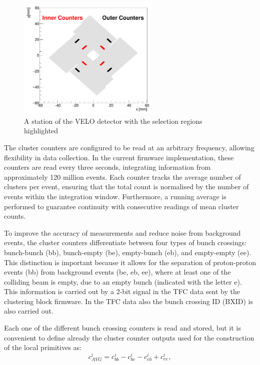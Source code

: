 \begin{figure}
    \centering
    \includegraphics[width=0.6\textwidth]{figures/counters.png}
    \caption{A station of the VELO detector with the selection regions highlighted}
    \label{fig:VELO-counters}
\end{figure}

The cluster counters are configured to be read at an arbitrary frequency, allowing flexibility in data collection. In the current firmware implementation, these counters are read every three seconds, integrating information from approximately 120 million events. 
Each counter tracks the average number of clusters per event, ensuring that the total count is normalised by the number of events within the integration window. Furthermore, a running average is performed to guarantee continuity with consecutive readings of mean cluster counts.

To improve the accuracy of measurements and reduce noise from background events, the cluster counters differentiate between four types of bunch crossings: bunch-bunch (bb), bunch-empty (be), empty-bunch (eb), and empty-empty (ee). This distinction is important because it allows for the separation of proton-proton events (bb) from background events (be, eb, ee), where at least one of the colliding beam is empty, due to an empty bunch (indicated with the letter e). This information is carried out by a 2-bit signal in the TFC data sent by the clustering block firmware. In the TFC data also the bunch crossing ID (BXID) is also carried out.

Each one of the different bunch crossing counters is read and stored, but it is convenient to define already the cluster counter outputs used for the construction of the local primitives as: 
\begin{equation}
    c^i_{AVG} = c^i_{bb} - c^i_{be} - c^i_{eb} + c^i_{ee},
\end{equation}

